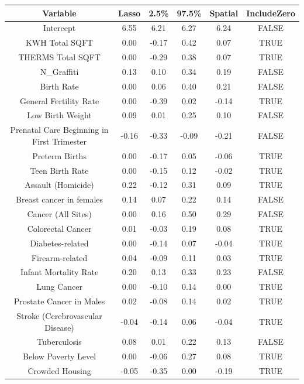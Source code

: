 \documentclass{article} %
\begin{document}
\begin{table}[H]
\centering
\begin{adjustbox}{width = \textwidth, height = \textheight}
\begin{tabular}{cccccc}
  \hline
Variable & Lasso & 2.5\% & 97.5\% & Spatial & IncludeZero \\ 
  \hline
Intercept & 6.55 & 6.21 & 6.27 & 6.24 & FALSE \\ 
  KWH Total SQFT & 0.00 & -0.17 & 0.42 & 0.07 & TRUE \\ 
  THERMS Total SQFT & 0.00 & -0.29 & 0.38 & 0.07 & TRUE \\ 
  N\_Graffiti & 0.13 & 0.10 & 0.34 & 0.19 & FALSE \\ 
  Birth Rate & 0.00 & 0.06 & 0.40 & 0.21 & FALSE \\ 
  General Fertility Rate & 0.00 & -0.39 & 0.02 & -0.14 & TRUE \\ 
  Low Birth Weight & 0.09 & 0.01 & 0.25 & 0.10 & FALSE \\ 
  Prenatal Care Beginning in First Trimester & -0.16 & -0.33 & -0.09 & -0.21 & FALSE \\ 
  Preterm Births & 0.00 & -0.17 & 0.05 & -0.06 & TRUE \\ 
  Teen Birth Rate & 0.00 & -0.15 & 0.12 & -0.02 & TRUE \\ 
  Assault (Homicide) & 0.22 & -0.12 & 0.31 & 0.09 & TRUE \\ 
  Breast cancer in females & 0.14 & 0.07 & 0.22 & 0.14 & FALSE \\ 
  Cancer (All Sites) & 0.00 & 0.16 & 0.50 & 0.29 & FALSE \\ 
  Colorectal Cancer & 0.01 & -0.03 & 0.19 & 0.08 & TRUE \\ 
  Diabetes-related & 0.00 & -0.14 & 0.07 & -0.04 & TRUE \\ 
  Firearm-related & 0.04 & -0.09 & 0.11 & 0.03 & TRUE \\ 
  Infant Mortality Rate & 0.20 & 0.13 & 0.33 & 0.23 & FALSE \\ 
  Lung Cancer & 0.00 & -0.10 & 0.14 & 0.00 & TRUE \\ 
  Prostate Cancer in Males & 0.02 & -0.08 & 0.14 & 0.02 & TRUE \\ 
  Stroke (Cerebrovascular Disease) & -0.04 & -0.14 & 0.06 & -0.04 & TRUE \\ 
  Tuberculosis & 0.08 & 0.01 & 0.22 & 0.13 & FALSE \\ 
  Below Poverty Level & 0.00 & -0.06 & 0.27 & 0.08 & TRUE \\ 
  Crowded Housing & -0.05 & -0.35 & 0.00 & -0.19 & TRUE \\ 

\end{tabular}
\end{adjustbox}
\end{table}
\end{document}
